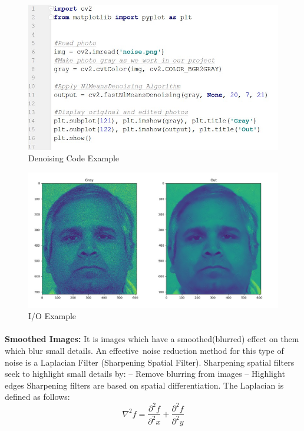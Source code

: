 \begin{figure}[H]
	\centering
	\includegraphics[width=\linewidth]{denoising_code.jpg}
	\caption{Denoising Code Example}
\end{figure}

\begin{figure}[H]
	\centering
	\includegraphics[width=\linewidth]{gaussian.jpg}
	\caption{I/O Example}
\end{figure}

\paragraph{}
\textbf{Smoothed Images:}\newline
It is images which have a smoothed(blurred) effect on them which blur small details.\newline
An effective noise reduction method for this type of noise is a Laplacian Filter (Sharpening Spatial Filter).\newline
Sharpening spatial filters seek to highlight small details by:\newline
– Remove blurring from images\newline
– Highlight edges\newline
Sharpening filters are based on spatial differentiation.\newline
The Laplacian is defined as follows:\newline
\[\nabla^{2} f = \frac{\partial^{2}f}{\partial^{2}x} + \frac{\partial^{2}f}{\partial^{2}y}\]

